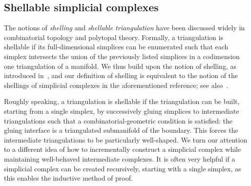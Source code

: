 \documentclass[12pt,a4paper]{article}
\begin{document}
% 
% 







\subsection{Shellable simplicial complexes}


The notions of \emph{shelling} and \emph{shellable triangulation} have been discussed widely in combinatorial topology and polytopal theory. 
Formally, a triangulation is shellable if its full-dimensional simplices can be enumerated such that each simplex intersects the union of the previously listed simplices in a codimension one triangulation of a manifold. 
We thus build upon the notion of shelling, as introduced in~\cite[Definition 8.1]{ziegler2012lectures},
and our definition of shelling is equivalent to the notion of the shellings of simplicial complexes in the aforementioned reference; see also~\cite[Remark~8.3]{ziegler2012lectures}. 

Roughly speaking, a triangulation is shellable if the triangulation can be built, starting from a single simplex,
by successively gluing simplices to intermediate triangulations such that a combinatorial-geometric condition is satisfied:
the gluing interface is a triangulated submanifold of the boundary. 
This forces the intermediate triangulations to be particularly well-shaped. 
We turn our attention to a different idea of how to incrementally construct a simplicial complex while maintaining well-behaved intermediate complexes. 
It is often very helpful if a simplicial complex can be created recursively, starting with a single simplex, 
as this enables the inductive method of proof.
\\
\end{document}
